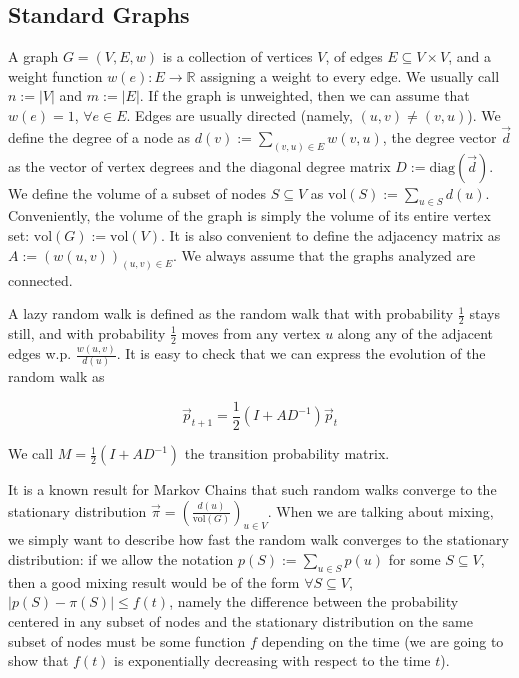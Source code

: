 \documentclass[../main.tex]{subfiles}
\begin{document}
\subsection{Standard Graphs}
\label{subsec:definition_graphs}
    
    A graph $G = (V, E, w)$ is a collection of vertices $V$, of edges $E\subseteq V\times V$, and a weight function $w(e): E\to \mathbb{R}$ assigning a weight to every edge. We usually call $n := |V|$ and $m := |E|$. If the graph is unweighted, then we can assume that $w(e) = 1$, $\forall e\in E$. Edges are usually directed (namely, $(u,v) \neq (v,u)$). We define the degree of a node as $d(v) := \sum_{(v, u)\in E} w(v,u)$, the degree vector $\vec{d}$ as the vector of vertex degrees and the diagonal degree matrix $D:=\text{diag}(\vec{d})$. We define the volume of a subset of nodes $S\subseteq V$ as $\text{vol}(S) := \sum_{u\in S} d(u)$. Conveniently, the volume of the graph is simply the volume of its entire vertex set: $\text{vol}(G) := \text{vol}(V)$. It is also convenient to define the adjacency matrix as $A:=(w(u,v))_{(u,v)\in E}$. We always assume that the graphs analyzed are connected.
    
    A lazy random walk is defined as the random walk that with probability $\frac{1}{2}$ stays still, and with probability $\frac{1}{2}$ moves from any vertex $u$ along any of the adjacent edges w.p. $\frac{w(u,v)}{d(u)}$. It is easy to check that we can express the evolution of the random walk as
    
    \begin{equation}
        \vec{p}_{t+1} = \frac{1}{2}(I + AD^{-1})\vec{p}_t
    \end{equation}
    
    We call $M = \frac{1}{2}(I+AD^{-1})$ the transition probability matrix.
    
    It is a known result for Markov Chains that such random walks converge to the stationary distribution $\vec{\pi} = \left(\frac{d(u)}{\text{vol}(G)}\right)_{u\in V}$. When we are talking about mixing, we simply want to describe how fast the random walk converges to the stationary distribution: if we allow the notation $p(S) := \sum_{u\in S} p(u)$ for some $S\subseteq V$, then a good mixing result would be of the form $\forall S\subseteq V$, $|p(S) - \pi(S)| \leq f(t)$, namely the difference between the probability centered in any subset of nodes and the stationary distribution on the same subset of nodes must be some function $f$ depending on the time (we are going to show that $f(t)$ is exponentially decreasing with respect to the time $t$).
    
\end{document}
